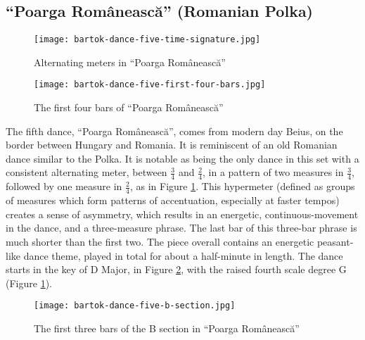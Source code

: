 \subsection{``Poarga Românească'' (Romanian Polka)}

\begin{figure}
  \centering
  \texttt{[image: bartok-dance-five-time-signature.jpg]}
  \caption[The alternating meters in ``Poarga Românească'' of Bartok's \textit{Romanian Folk Dances, Sz. 56, BB 68}]{Alternating meters in ``Poarga Românească''}
  \label{fig:bartok-dance-five-time-signature}
\end{figure}

\begin{figure}
  \centering
  \texttt{[image: bartok-dance-five-first-four-bars.jpg]}
  \caption{The first four bars of ``Poarga Românească''}
  \label{fig:bartok-dance-five-first-four-bars}
\end{figure}


The fifth dance, ``Poarga Românească'', comes from modern day Beius, on the border between Hungary and Romania. It is reminiscent of an old Romanian dance similar to the Polka. It is notable as being the only dance in this set with a consistent alternating meter, between $\frac{3}{4}$ and $\frac{2}{4}$, in a pattern of two measures in $\frac{3}{4}$, followed by one measure in $\frac{2}{4}$, as in Figure \ref{fig:bartok-dance-five-time-signature}\autocite{Lung_2016}. This hypermeter (defined as groups of measures which form patterns of accentuation, especially at faster tempos\autocite{Hughes_Gotham_Hamm_2021}) creates a sense of asymmetry, which results in an energetic, continuous-movement in the dance, and a three-measure phrase. The last bar of this three-bar phrase is much shorter than the first two. The piece overall contains an energetic peasant-like dance theme, played in total for about a half-minute in length. The dance starts in the key of D Major, in Figure \ref{fig:bartok-dance-five-first-four-bars}\autocite{Lung_2016}, with the raised fourth scale degree G\musSharp{} (Figure \ref{fig:bartok-dance-five-time-signature}\autocite{Lung_2016}).

\begin{figure}
  \centering
  \texttt{[image: bartok-dance-five-b-section.jpg]}
  \caption[The first three bars in the B section of ``Poarga Românească'' in Bartok's \textit{Romanian Folk Dances, Sz. 56, BB 68}]{The first three bars of the B section in ``Poarga Românească''}
  \label{fig:bartok-dance-five-b-section}
\end{figure}

